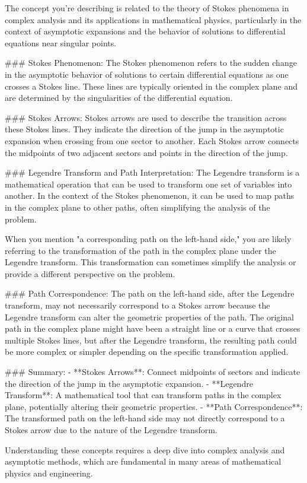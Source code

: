 The concept you're describing is related to the theory of Stokes phenomena in complex analysis and its applications in mathematical physics, particularly in the context of asymptotic expansions and the behavior of solutions to differential equations near singular points.

### Stokes Phenomenon:
The Stokes phenomenon refers to the sudden change in the asymptotic behavior of solutions to certain differential equations as one crosses a Stokes line. These lines are typically oriented in the complex plane and are determined by the singularities of the differential equation.

### Stokes Arrows:
Stokes arrows are used to describe the transition across these Stokes lines. They indicate the direction of the jump in the asymptotic expansion when crossing from one sector to another. Each Stokes arrow connects the midpoints of two adjacent sectors and points in the direction of the jump.

### Legendre Transform and Path Interpretation:
The Legendre transform is a mathematical operation that can be used to transform one set of variables into another. In the context of the Stokes phenomenon, it can be used to map paths in the complex plane to other paths, often simplifying the analysis of the problem.

When you mention "a corresponding path on the left-hand side," you are likely referring to the transformation of the path in the complex plane under the Legendre transform. This transformation can sometimes simplify the analysis or provide a different perspective on the problem.

### Path Correspondence:
The path on the left-hand side, after the Legendre transform, may not necessarily correspond to a Stokes arrow because the Legendre transform can alter the geometric properties of the path. The original path in the complex plane might have been a straight line or a curve that crosses multiple Stokes lines, but after the Legendre transform, the resulting path could be more complex or simpler depending on the specific transformation applied.

### Summary:
- **Stokes Arrows**: Connect midpoints of sectors and indicate the direction of the jump in the asymptotic expansion.
- **Legendre Transform**: A mathematical tool that can transform paths in the complex plane, potentially altering their geometric properties.
- **Path Correspondence**: The transformed path on the left-hand side may not directly correspond to a Stokes arrow due to the nature of the Legendre transform.

Understanding these concepts requires a deep dive into complex analysis and asymptotic methods, which are fundamental in many areas of mathematical physics and engineering.
